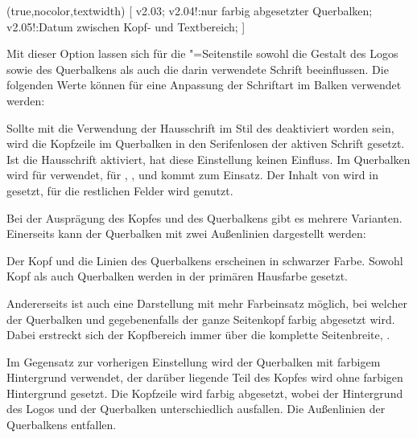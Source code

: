\begin{DeclareEntity*}{}
\begin{DeclareEntity*}{}
\begin{DeclareEntity*}{}
\begin{Declaration}
  {}
  (true,nocolor,textwidth)
[%
  v2.03;%
  v2.04!:nur farbig abgesetzter Querbalken;%
  v2.05!:Datum zwischen Kopf- und Textbereich;%
]

Mit dieser Option lassen sich für die "=Seitenstile 
sowohl die Gestalt des Logos sowie des Querbalkens als auch die darin 
verwendete Schrift beeinflussen. Die folgenden Werte können für eine Anpassung 
der Schriftart im Balken verwendet werden:
\begin{DeclareValues}
  Sollte mit  die Verwendung der Hausschrift im Stil des 
  \TUDCDs deaktiviert worden sein, wird die Kopfzeile im Querbalken in den 
  Serifenlosen der aktiven Schrift gesetzt. Ist die Hausschrift aktiviert, 
  hat diese Einstellung keinen Einfluss.
  Im Querbalken wird für   
  verwendet, für , , 
   und  kommt  zum 
  Einsatz.
  Der Inhalt von  wird in  gesetzt, für 
  die restlichen Felder wird  genutzt.
\end{DeclareValues}

Bei der Ausprägung des Kopfes und des Querbalkens gibt es mehrere Varianten. 
Einerseits kann der Querbalken mit zwei Außenlinien dargestellt werden:
\begin{DeclareValues}
  Der Kopf und die Linien des Querbalkens erscheinen in schwarzer Farbe.
  Sowohl Kopf als auch Querbalken werden in der primären Hausfarbe gesetzt.
\end{DeclareValues}

Andererseits ist auch eine Darstellung mit mehr Farbeinsatz möglich, bei 
welcher der Querbalken und gegebenenfalls der ganze Seitenkopf farbig 
abgesetzt wird. Dabei erstreckt sich der Kopfbereich immer über die komplette 
Seitenbreite, .
\begin{DeclareValues}
  Im Gegensatz zur vorherigen Einstellung wird der Querbalken mit farbigem 
  Hintergrund verwendet, der darüber liegende Teil des Kopfes wird ohne 
  farbigen Hintergrund gesetzt.
  Die Kopfzeile wird farbig abgesetzt, wobei der Hintergrund des Logos und der 
  Querbalken unterschiedlich ausfallen. Die Außenlinien der Querbalkens 
  entfallen.
\end{DeclareValues}


\end{Declaration}
\end{DeclareEntity*}
\end{DeclareEntity*}
\end{DeclareEntity*}
